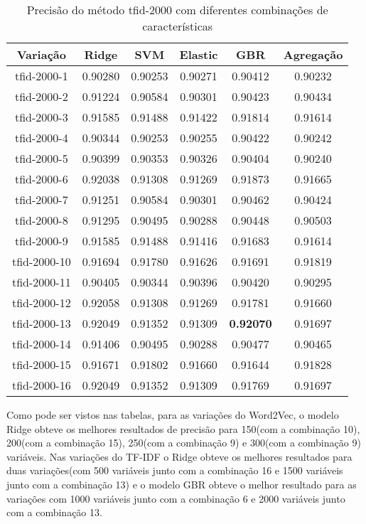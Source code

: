 \begin{table}[H]
\centering
\begin{tabular}{|c| c c  c  c  c| }
\hline
Variação &  Ridge & SVM & Elastic & GBR & Agregação  \\ 
\hline
tfid-2000-1 & 0.90280 & 0.90253 & 0.90271 & 0.90412 & 0.90232 \\
\hline
tfid-2000-2 & 0.91224 & 0.90584 & 0.90301 & 0.90423 & 0.90434 \\
\hline
tfid-2000-3 & 0.91585 & 0.91488 & 0.91422 & 0.91814 & 0.91614 \\
\hline
tfid-2000-4 & 0.90344 & 0.90253 & 0.90255 & 0.90422 & 0.90242 \\
\hline
tfid-2000-5 & 0.90399 & 0.90353 & 0.90326 & 0.90404 & 0.90240 \\
\hline
tfid-2000-6 & 0.92038 & 0.91308 & 0.91269 & 0.91873 & 0.91665 \\
\hline
tfid-2000-7 & 0.91251 & 0.90584 & 0.90301 & 0.90462 & 0.90424 \\
\hline
tfid-2000-8 & 0.91295 & 0.90495 & 0.90288 & 0.90448 & 0.90503 \\
\hline
tfid-2000-9 & 0.91585 & 0.91488 & 0.91416 & 0.91683 & 0.91614 \\
\hline
tfid-2000-10 & 0.91694 & 0.91780 & 0.91626 & 0.91691 & 0.91819 \\
\hline
tfid-2000-11 & 0.90405 & 0.90344 & 0.90396 & 0.90420 & 0.90295 \\
\hline
tfid-2000-12 & 0.92058 & 0.91308 & 0.91269 & 0.91781 & 0.91660 \\
\hline
tfid-2000-13 & 0.92049 & 0.91352 & 0.91309 & \textbf{0.92070} & 0.91697 \\
\hline
tfid-2000-14 & 0.91406 & 0.90495 & 0.90288 & 0.90477 & 0.90465 \\
\hline
tfid-2000-15 & 0.91671 & 0.91802 & 0.91660 & 0.91644 & 0.91828 \\
\hline
tfid-2000-16 & 0.92049 & 0.91352 & 0.91309 & 0.91769 & 0.91697 \\
\hline
\end{tabular}
\caption{Precisão do método tfid-2000 com diferentes combinações de características}
\label{tab:precisiontfid2000}
\end{table}

 Como pode ser vistos nas tabelas, para as variações do Word2Vec, o modelo Ridge obteve os melhores resultados de precisão para 150(com a combinação 10), 200(com a combinação 15), 250(com a combinação 9) e 300(com a combinação 9) variáveis. Nas variações do TF-IDF o Ridge obteve os melhores resultados para duas variações(com 500 variáveis junto com a combinação 16 e  1500 variáveis junto com a combinação 13) e o modelo GBR obteve o melhor resultado para as variações com 1000 variáveis junto com a combinação 6 e 2000 variáveis junto com a combinação 13.
 
